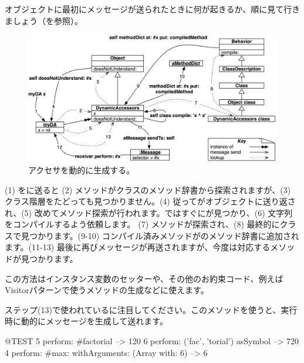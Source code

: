 \documentclass[a4paper,10pt,twoside]{book}
\begin{document}
オブジェクトに最初にメッセージが送られたときに何が起きるか、順に見て行きましょう（を参照）。

\begin{figure}[ht]\centering
	\includegraphics[width=\linewidth]{DynamicAccessors}
	\caption{アクセサを動的に生成する。}
\end{figure}

(1) をに送ると (2) メソッドがクラスのメソッド辞書から探索されますが、(3) クラス階層をたどっても見つかりません。(4) 従ってがオブジェクトに送り返され、(5) 改めてメソッド探索が行われます。ではすぐにが見つかり、(6) 文字列をコンパイルするよう依頼します。 (7) メソッドが探索され、(8) 最終的にクラスで見つかります。(9-10) コンパイル済みメソッドがのメソッド辞書に追加されます。(11-13) 最後に再びメッセージが再送されますが、今度は対応するメソッドが見つかります。

この方法はインスタンス変数のセッターや、その他のお約束コード、例えばVisitorパターンで使うメソッドの生成などに使えます。

ステップ(13)で使われているに注目してください。このメソッドを使うと、実行時に動的にメッセージを生成して送れます。
\begin{code}{@TEST}
5 perform: #factorial                                             --> 120
6 perform: ('fac', 'torial') asSymbol                       --> 720
4 perform: #max: withArguments: (Array with: 6) --> 6
\end{code}
\end{document}
